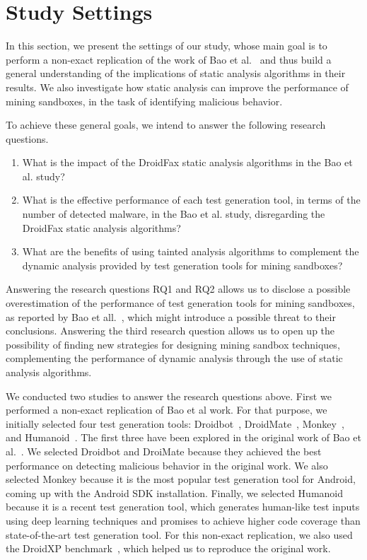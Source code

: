 \section{Study Settings}

In this section, we present the settings of our study, whose main goal is to perform a non-exact replication of the work of Bao et al.~\cite{DBLP:conf/wcre/BaoLL18} and thus build
a general understanding of the implications of static analysis algorithms in their results. We also investigate how static analysis can improve
the performance of mining sandboxes, in the task of identifying malicious behavior.

To achieve these general goals, we intend to answer the following research questions.

\begin{enumerate}[(RQ1)]
 \item What is the impact of the DroidFax static analysis algorithms in the Bao et al. study?
  
 \item What is the effective performance of each test generation tool, in terms of the number of detected malware, in the Bao et al. study, disregarding the DroidFax
  static analysis algorithms?

 \item What are the benefits of using tainted analysis algorithms to complement the dynamic analysis provided by test generation tools for mining sandboxes?
\end{enumerate}

Answering the research questions RQ1 and RQ2 allows us to disclose a possible overestimation of the performance of test generation tools for mining sandboxes,
as reported by Bao et all.~\cite{DBLP:conf/wcre/BaoLL18}, which might introduce a possible threat to their conclusions. Answering the third research question
allows us to open up the possibility of finding new strategies for designing mining sandbox techniques, complementing the performance of
dynamic analysis through the use of static analysis algorithms.

We conducted two studies to answer the research questions above. First we performed a non-exact replication of Bao et al work.
For that purpose, we initially selected four test generation tools: Droidbot~\cite{DBLP:conf/icse/LiYGC17},
DroidMate~\cite{DBLP:conf/icse/JamrozikZ16}, Monkey~\cite{Monkey}, and Humanoid~\cite{DBLP:conf/kbse/LiY0C19}. The first three have
been explored in the original work of Bao et al.~\cite{DBLP:conf/icse/JamrozikZ16}. We selected Droidbot and DroiMate because they achieved
the best performance on detecting malicious behavior in the original work. We also selected Monkey because it is the most popular test
generation tool for Android, coming up with the Android SDK installation. Finally, we selected Humanoid  because it is a recent test generation tool,
which generates human-like test inputs using deep learning techniques and promises to achieve higher code coverage
than state-of-the-art test generation tool. 
For this non-exact replication, we also used the DroidXP benchmark~\cite{DBLP:conf/scam/CostaMCMVBC20},
which helped us to reproduce the original work.


